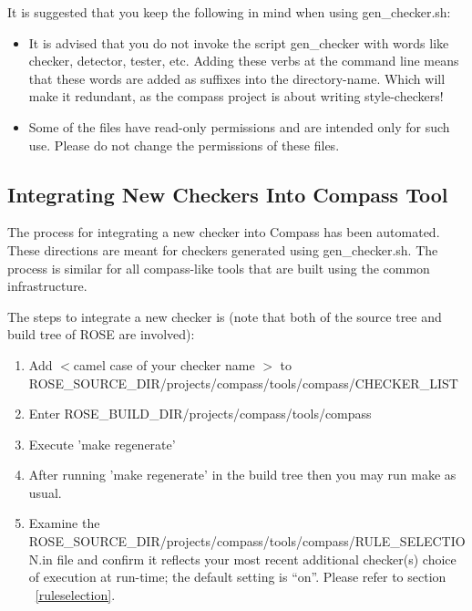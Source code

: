 It is suggested that you keep the following in mind when using gen\_checker.sh:
\begin{itemize}
\item
   It is advised that you do not invoke the script gen\_checker with words
   like checker, detector, tester, etc. Adding these verbs at the command
   line means that these words are added as suffixes into the
   directory-name. Which will make it redundant, as the compass project is
   about writing style-checkers!
\item
   Some of the files have read-only permissions and are intended only for
   such use. Please do not change the permissions of these files.

\end{itemize}

\subsection{Integrating New Checkers Into Compass Tool}
\label{howToIntegrateNewCheckers}

The process for integrating a new checker into Compass has been automated. 
These directions are meant for checkers generated using gen\_checker.sh. 
The process is similar for all compass-like tools that are built using the 
common infrastructure.

The steps to integrate a new checker is (note that both of the source tree and
build tree of ROSE are involved):
\begin{enumerate}
   \item Add $<$camel case of your checker name $>$ to
   ROSE\_SOURCE\_DIR/projects/compass/tools/compass/CHECKER\_LIST
   \item Enter ROSE\_BUILD\_DIR/projects/compass/tools/compass
   \item Execute 'make regenerate'
   \item After running 'make regenerate' in the build tree then you may run make as usual.
   \item Examine the ROSE\_SOURCE\_DIR/projects/compass/tools/compass/RULE\_SELECTION.in file and confirm it
	reflects your most recent additional checker(s) choice of execution at
	run-time; the default setting is ``on''. Please refer to section 
	~\ref{ruleselection}.
\end{enumerate}

